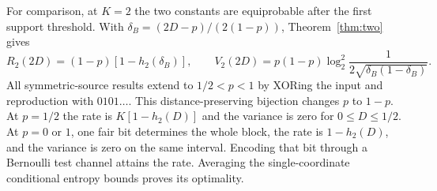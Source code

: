 \documentclass[11pt,letterpaper]{article}
\theoremstyle{definition}
\newcommand{\hx}{h_2}
\begin{document}
For comparison, at $K=2$ the two constants are equiprobable after the first support threshold. With $\delta_B=(2D-p)/(2(1-p))$, Theorem~\ref{thm:two} gives
\begin{equation}
 R_2(2D)=(1-p)[1-\hx(\delta_B)],\qquad
 V_2(2D)=p(1-p)\log_2^2\!\frac{1}{2\sqrt{\delta_B(1-\delta_B)}} .             \label{eq:sym2}
\end{equation}
All symmetric-source results extend to $1/2<p<1$ by XORing the input and reproduction with $0101\ldots$. This distance-preserving bijection changes $p$ to $1-p$. At $p=1/2$ the rate is $K[1-\hx(D)]$ and the variance is zero for $0\le D\le1/2$. At $p=0$ or $1$, one fair bit determines the whole block, the rate is $1-\hx(D)$, and the variance is zero on the same interval. Encoding that bit through a Bernoulli test channel attains the rate. Averaging the single-coordinate conditional entropy bounds proves its optimality.
\end{document}
